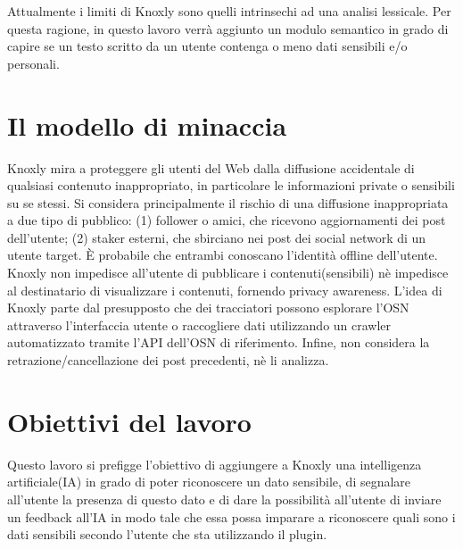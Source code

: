 Attualmente i limiti di Knoxly sono quelli intrinsechi ad una analisi lessicale. Per questa ragione, in questo lavoro verrà aggiunto un modulo semantico in grado di capire se un testo scritto da un utente contenga o meno dati sensibili e/o personali.

\section{Il modello di minaccia}
Knoxly mira a proteggere gli utenti del Web dalla diffusione accidentale di qualsiasi contenuto inappropriato, in particolare le informazioni private o sensibili su se stessi. Si considera principalmente il rischio di una diffusione inappropriata a due tipo di pubblico: (1) follower o amici, che ricevono aggiornamenti dei post dell'utente; (2) staker esterni, che sbirciano nei post dei social network di un utente target. È probabile che entrambi conoscano l'identità offline dell'utente. Knoxly non impedisce all'utente di pubblicare i contenuti(sensibili) nè impedisce al destinatario di visualizzare i contenuti, fornendo privacy awareness. L'idea di Knoxly parte dal presupposto che dei tracciatori possono esplorare l'OSN attraverso l'interfaccia utente o raccogliere dati utilizzando un crawler automatizzato tramite l'API dell'OSN di riferimento. Infine, non considera la retrazione/cancellazione dei post precedenti, nè li analizza.

\section{Obiettivi del lavoro}
Questo lavoro si prefigge l'obiettivo di aggiungere a Knoxly una intelligenza artificiale(IA) in grado di poter riconoscere un dato sensibile, di segnalare all'utente la presenza di questo dato e di dare la possibilità all'utente di inviare un feedback all'IA in modo tale che essa possa imparare a riconoscere quali sono i dati sensibili secondo l'utente che sta utilizzando il plugin.
